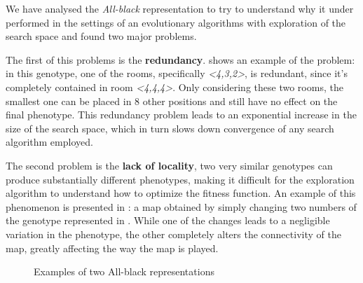 We have analysed the \textit{All-black} representation to try to understand why it under performed in the settings of an evolutionary algorithms with exploration of the search space and found two major problems.

The first of this problems is the \textbf{redundancy}.  shows an example of the problem: in this genotype, one of the rooms, specifically \textit{<4,3,2>}, is redundant, since it's completely contained in room \textit{<4,4,4>}. Only considering these two rooms, the smallest one can be placed in 8 other positions and still have no effect on the final phenotype. This redundancy problem leads to an exponential increase in the size of the search space, which in turn slows down convergence of any search algorithm employed.

The second problem is the \textbf{lack of locality}, two very similar genotypes can produce substantially different phenotypes, making it difficult for the exploration algorithm to understand how to optimize the fitness function. An example of this phenomenon is presented in : a map obtained by simply changing two numbers of the genotype represented in . While one of the changes leads to a negligible variation in the phenotype, the other completely alters the connectivity of the map, greatly affecting the way the map is played.

\begin{figure}
\centering
\captionsetup[subfigure]{}

\caption{Examples of two All-black representations}
\end{figure}

